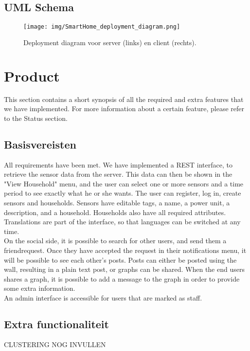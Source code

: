 \documentclass[11pt]{article}
\begin{document}
  \subsection{UML Schema}
  \begin{figure}[H]
  \centering
    \texttt{[image: img/SmartHome\_deployment\_diagram.png]}
  \caption{Deployment diagram voor server (links) en client (rechts).}
  \label{fig:uml}
  \end{figure}

\section{Product}
	This section contains a short synopsis of all the required and extra features that we have implemented.
	For more information about a certain feature, please refer to the Status section.

  \subsection{Basisvereisten}
	All requirements have been met. We have implemented a REST interface, to retrieve the sensor data from the server.
	This data can then be shown in the "View Household" menu, and the user can select one or more sensors and a time period to see exactly what he or she wants.
	The user can register, log in, create sensors and households. Sensors have editable tags, a name, a power unit, a description, and a household.
	Households also have all required attributes.\\

	Translations are part of the interface, so that languages can be switched at any time.\\

	On the social side, it is possible to search for other users, and send them a friendrequest.
	Once they have accepted the request in their notifications menu, it will be possible to see each other's posts.
	Posts can either be posted using the wall, resulting in a plain text post, or graphs can be shared.
	When the end users shares a graph, it is possible to add a message to the graph in order to provide some extra information.\\

	An admin interface is accessible for users that are marked as staff.\\

  \subsection{Extra functionaliteit}
	CLUSTERING NOG INVULLEN
\end{document}
